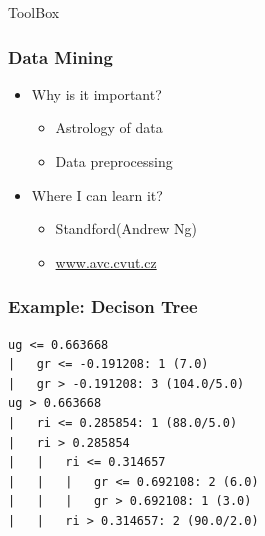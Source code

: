 \documentclass[fleqn]{beamer}
\begin{document}
\begin{section}{ToolBox}
  \begin{frame}\frametitle{Data Mining}
  \begin{itemize}
    \item{Why is it important?}
      \begin{itemize}
      \item Astrology of data
      \item Data preprocessing
      \end{itemize}
    \item{Where I can learn it?}
      \begin{itemize}
      \item {Standford(Andrew Ng)}
      \item {\url{www.avc.cvut.cz}}
      \end{itemize}
  \end{itemize}
  \end{frame}

\begin{frame}[containsverbatim]\frametitle{Example: Decison Tree}

\begin{lstlisting}
ug <= 0.663668
|   gr <= -0.191208: 1 (7.0)
|   gr > -0.191208: 3 (104.0/5.0)
ug > 0.663668
|   ri <= 0.285854: 1 (88.0/5.0)
|   ri > 0.285854
|   |   ri <= 0.314657
|   |   |   gr <= 0.692108: 2 (6.0)
|   |   |   gr > 0.692108: 1 (3.0)
|   |   ri > 0.314657: 2 (90.0/2.0)
\end{lstlisting}

\end{frame}


\end{section}

\end{document}
